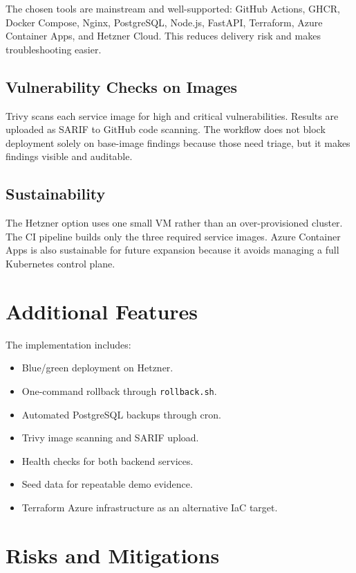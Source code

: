 \documentclass[11pt,a4paper]{article}
\begin{document}
The chosen tools are mainstream and well-supported: GitHub Actions, GHCR, Docker Compose, Nginx, PostgreSQL, Node.js, FastAPI, Terraform, Azure Container Apps, and Hetzner Cloud. This reduces delivery risk and makes troubleshooting easier.

\subsection{Vulnerability Checks on Images}

Trivy scans each service image for high and critical vulnerabilities. Results are uploaded as SARIF to GitHub code scanning. The workflow does not block deployment solely on base-image findings because those need triage, but it makes findings visible and auditable.

\subsection{Sustainability}

The Hetzner option uses one small VM rather than an over-provisioned cluster. The CI pipeline builds only the three required service images. Azure Container Apps is also sustainable for future expansion because it avoids managing a full Kubernetes control plane.

\section{Additional Features}

The implementation includes:

\begin{itemize}
\item Blue/green deployment on Hetzner.
\item One-command rollback through \texttt{rollback.sh}.
\item Automated PostgreSQL backups through cron.
\item Trivy image scanning and SARIF upload.
\item Health checks for both backend services.
\item Seed data for repeatable demo evidence.
\item Terraform Azure infrastructure as an alternative IaC target.
\end{itemize}

\section{Risks and Mitigations}
\end{document}
